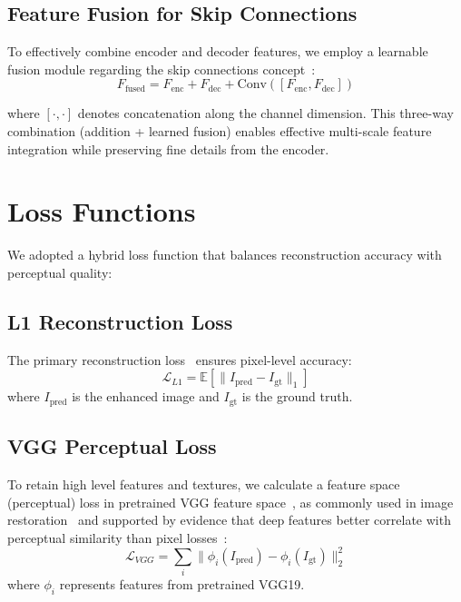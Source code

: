 \documentclass[sigconf]{acmart}
\begin{document}
\subsection{Feature Fusion for Skip Connections}

To effectively combine encoder and decoder features, we employ a learnable fusion module regarding the skip connections concept~\cite{ronneberger2015unet}:
\begin{equation}
F_{\text{fused}} = F_{\text{enc}} + F_{\text{dec}} + \text{Conv}([F_{\text{enc}}, F_{\text{dec}}])
\end{equation}

where $[\cdot, \cdot]$ denotes concatenation along the channel dimension. This three-way combination (addition + learned fusion) enables effective multi-scale feature integration while preserving fine details from the encoder.

\section{Loss Functions}

We adopted a hybrid loss function that balances reconstruction accuracy with perceptual quality:

\subsection{L1 Reconstruction Loss}
The primary reconstruction loss~\cite{isola2016pix2pix} ensures pixel-level accuracy:
\begin{equation}
\mathcal{L}_{L1} = \mathbb{E}[\|I_{\text{pred}} - I_{\text{gt}}\|_1]
\end{equation}
where $I_{\text{pred}}$ is the enhanced image and $I_{\text{gt}}$ is the ground truth.

\subsection{VGG Perceptual Loss}
To retain high level features and textures, we calculate a feature space (perceptual) loss in pretrained VGG feature space~\cite{simonyan2014vgg}, as commonly used in image restoration~\cite{ledig2016srgan} and supported by evidence that deep features better correlate with perceptual similarity than pixel losses~\cite{zhang2018lpips}:
\begin{equation}
\mathcal{L}_{VGG} = \sum_{i} \|\phi_i(I_{\text{pred}}) - \phi_i(I_{\text{gt}})\|_2^2
\end{equation}
where $\phi_i$ represents features from pretrained VGG19.
\end{document}
